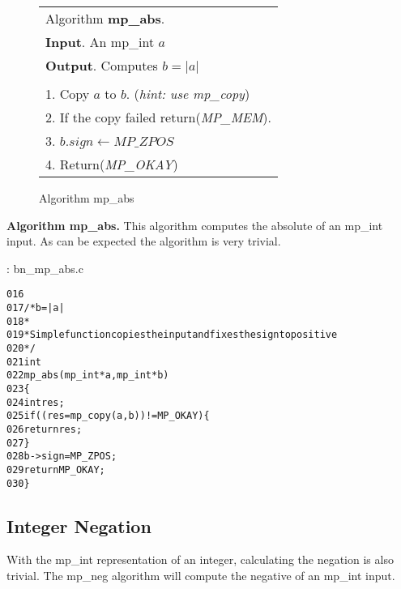 \documentclass[b5paper]{book}
\begin{document}
\begin{figure}[here]
\begin{center}
\begin{tabular}{l}
\hline Algorithm \textbf{mp\_abs}. \\
\textbf{Input}.   An mp\_int $a$ \\
\textbf{Output}.  Computes $b = \vert a \vert$ \\
\hline \\
1.  Copy $a$ to $b$.  (\textit{hint: use mp\_copy}) \\
2.  If the copy failed return(\textit{MP\_MEM}). \\
3.  $b.sign \leftarrow MP\_ZPOS$ \\
4.  Return(\textit{MP\_OKAY}) \\
\hline
\end{tabular}
\end{center}
\caption{Algorithm mp\_abs}
\end{figure}

\textbf{Algorithm mp\_abs.}
This algorithm computes the absolute of an mp\_int input.  As can be expected the algorithm is very trivial.

\vspace{+3mm}\begin{small}
\hspace{-5.1mm}{\bf File}: bn\_mp\_abs.c
\vspace{-3mm}
\begin{alltt}
016   
017   /* b = |a| 
018    *
019    * Simple function copies the input and fixes the sign to positive
020    */
021   int
022   mp_abs (mp_int * a, mp_int * b)
023   \{
024     int     res;
025     if ((res = mp_copy (a, b)) != MP_OKAY) \{
026       return res;
027     \}
028     b->sign = MP_ZPOS;
029     return MP_OKAY;
030   \}
\end{alltt}
\end{small}

\subsection{Integer Negation}
With the mp\_int representation of an integer, calculating the negation is also trivial.  The mp\_neg algorithm will compute
the negative of an mp\_int input.
\end{document}
